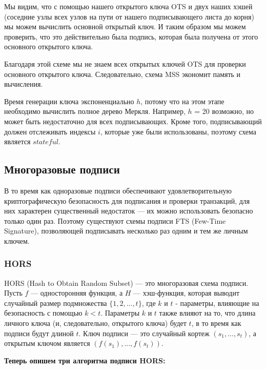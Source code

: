 \documentclass[a4paper, 14pt]{extarticle}
\begin{document}
Мы видим, что с помощью нашего открытого ключа OTS и двух наших хэшей (соседние узлы всех узлов на пути от нашего подписывающего листа до корня) мы можем вычислить основной открытый ключ. И таким образом мы можем проверить, что это действительно была подпись, которая была получена от этого основного открытого ключа.

Благодаря этой схеме мы не знаем всех открытых ключей OTS для проверки основного открытого ключа. Следовательно, схема MSS экономит память и вычисления.

Время генерации ключа экспоненциально $h$, потому что на этом этапе необходимо вычислить полное дерево Меркля. Например, $h$ = 20 возможно, но может быть недостаточно для всех подписывающих. Кроме того, подписывающий должен отслеживать индексы $i$, которые уже были использованы, поэтому схема является $stateful$.
\newpage

\subsection{Многоразовые подписи}
В то время как одноразовые подписи обеспечивают удовлетворительную криптографическую безопасность для подписания и проверки транзакций, для них характерен существенный недостаток --- их можно использовать безопасно только один раз. Поэтому существуют схемы подписи FTS (Few-Time Signature), позволяющей подписывать несколько раз одним и тем же личным ключем.
\subsubsection{HORS}
HORS (Hash to Obtain Random Subset) --- это многоразовая схема подписи. Пусть $f$ --- односторонняя функция, а $H$ --- хэш-функция, которая выводит случайный размер подмножества $\{1,2,...,t\}$, где $k$ и $t$ - параметры, влияющие на безопасность с помощью $k < t$. Параметры $k$ и $t$ также влияют на то, что длина личного ключа (и, следовательно, открытого ключа) будет $t$, в то время как подписи будут длиной $t$. Ключ подписи --- это случайный кортеж $(s_1,...,s_t)$, а открытым ключом является $(f(s_{1}),..., f(s_{t}))$.
\newline

\textbf{Теперь опишем три алгоритма подписи HORS:}
\end{document}
